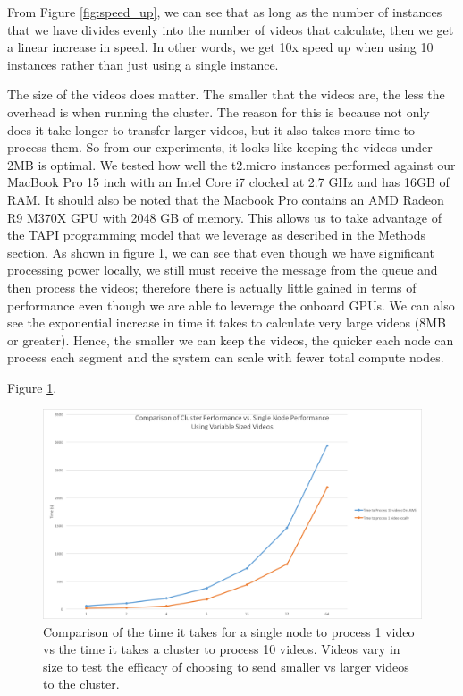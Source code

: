 From Figure \ref{fig:speed_up}, we can see that as long as the number of instances
that we have divides evenly into the number of videos that calculate, then we
get a linear increase in speed. In other words, we get 10x speed up when using
10 instances rather than just using a single instance.

The size of the videos does matter. The smaller that the videos are, the less
the overhead is when running the cluster. The reason for this is because not only
does it take longer to transfer larger videos, but it also takes more time to process
them. So from our experiments, it looks like keeping the videos under 2MB is optimal.
We tested how well the t2.micro instances performed against our MacBook Pro 15 inch
with an Intel Core i7 clocked at 2.7 GHz and has 16GB of RAM. It should also be
noted that the Macbook Pro contains an AMD Radeon R9 M370X GPU with 2048 GB of
memory. This allows us to take advantage of the TAPI programming model that
we leverage as described in the Methods section.  As shown in figure \ref{fig:size_matters},
we can see that even though we have significant processing power locally, we still
must receive the message from the queue and then process the videos; therefore
there is actually little gained in terms of performance even though we are able
to leverage the onboard GPUs. We can also see the exponential increase in time
it takes to calculate very large videos (8MB or greater). Hence, the smaller
we can keep the videos, the quicker each node can process each segment and the
system can scale with fewer total compute nodes.

Figure \ref{fig:size_matters}.

\begin{figure}[h]
  \label{fig:size_matters}
  \centering
  \includegraphics[width=\textwidth]{figures/size_matters}
  \caption{Comparison of the time it takes for a single node to process 1 video
  vs the time it takes a cluster to process 10 videos. Videos vary in size to
  test the efficacy of choosing to send smaller vs larger videos to the cluster.}
\end{figure}

